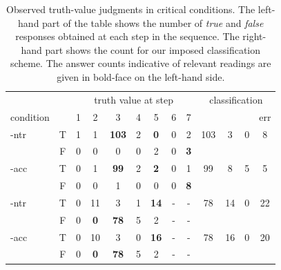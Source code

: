 \documentclass[fleqn,reqno,10pt,draft]{article}
\newcommand{\lit}{\acro{lit}}
\newcommand{\glb}{\acro{glb}}
\newcommand{\loc}{\acro{loc}}
\newcommand{\as}{\acro{as}}
\renewcommand{\es}{\acro{es}}
\begin{document}
\begin{table}
  \centering
  \begin{tabular}{lcccccccc@{\hskip 0.6cm}cccc}
    && \multicolumn{7}{c}{truth value at step}
    & \multicolumn{4}{c}{classification}
    \\ \cmidrule(l){3-9} \cmidrule(r){10-13}
    condition &
    & 1
    & 2
    & 3
    & 4
    & 5
    & 6
    & 7
    & \lit
    & \loc
    & \glb
    & err \\ \midrule
    \as-ntr 
    & T & 1 & 1 & \textbf{103} & 2 & \textbf{0} & 0 & 2 
    & 103 & 3 & 0 & 8 \\
    & F & 0 & 0 & 0 & 0 & 2 & 0 & \textbf{3} \\ 
    \addlinespace[0.25cm]
    \as-acc
    & T & 0 & 1 & \textbf{99} & 2 & \textbf{2} & 0 & 1 
    & 99 & 8 & 5 & 5 \\
    & F & 0 & 0 & 1 & 0 & 0 & 0 & \textbf{8} \\
    \addlinespace[0.25cm]
    \es-ntr
    & T & 0 & 11 & 3 & 1 & \textbf{14} & - & - 
    & 78 & 14 & 0 & 22 \\
    & F & 0 & \textbf{0} & \textbf{78} & 5 & 2 & - & - \\
    \addlinespace[0.25cm]
    \es-acc
    & T & 0 & 10 & 3 & 0 & \textbf{16} & - & - 
    & 78 & 16 & 0 & 20 \\
    & F & 0 & \textbf{0} & \textbf{78} & 5 & 2 & - & -
  \end{tabular}
  \caption{Observed truth-value judgments in critical conditions. The
    left-hand part of the table shows the number of \emph{true} and
    \emph{false} responses obtained at each step in the sequence. The
    right-hand part shows the count for our imposed classification
    scheme. The answer counts indicative of relevant readings are
    given in bold-face on the left-hand side.}
  \label{tab:count_data_CC}
\end{table}


%
\end{document}
